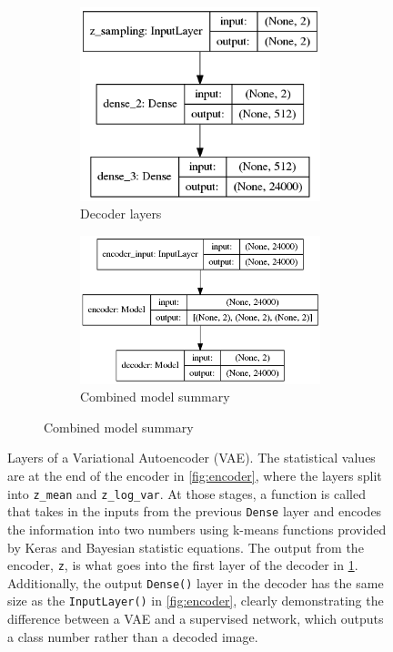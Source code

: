 \documentclass[a4paper]{article}
\begin{document}
\begin{figure}[h!]
\begin{subfigure}{.49\textwidth}
\begin{subfigure}{.6\textwidth}
			\includegraphics[width=1\linewidth]{vae_mlp_decoder}
			\caption{Decoder layers}
			\label{fig:vae_decoder}
		\end{subfigure}
		\vspace{10mm}%
		\begin{subfigure}{.8\textwidth}
			\centering
			\includegraphics[width=1\linewidth]{vae_mlp}
			\caption{Combined model summary}
			\label{fig:vae_mlp}
		\end{subfigure}
		\label{fig:decoder}
	\end{subfigure}
	
	\caption{Layers of a Variational Autoencoder (VAE). The statistical values are at the end of the encoder in \ref{fig:encoder}, where the layers split into \texttt{z\_mean} and \texttt{z\_log\_var}. At those stages, a function is called that takes in the inputs from the previous \texttt{Dense} layer and encodes the information into two numbers using k-means functions provided by Keras and Bayesian statistic equations. The output from the encoder, \texttt{z}, is what goes into the first layer of the decoder in \ref{fig:vae_decoder}. Additionally, the output \texttt{Dense()} layer in the decoder has the same size as the \texttt{InputLayer()} in \ref{fig:encoder}, clearly demonstrating the difference between a VAE and a supervised network, which outputs a class number rather than a decoded image.}
	\label{fig:vae}
\end{figure} 
\end{document}
